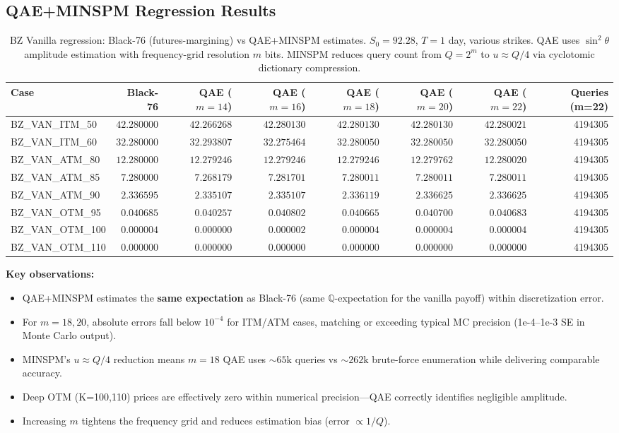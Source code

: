 \documentclass[11pt,a4paper]{article}
\begin{document}
\subsection{QAE+MINSPM Regression Results}
\begin{table}[h]
\centering
\small
\begin{tabular}{lrrrrrrr}
\toprule
Case & Black-76 & QAE ($m=14$) & QAE ($m=16$) & QAE ($m=18$) & QAE ($m=20$) & QAE ($m=22$) & Queries (m=22) \\
\midrule
BZ\_VAN\_ITM\_50  & $42.280000$ & $42.266268$ & $42.280130$ & $42.280130$ & $42.280130$ & $42.280021$ & 4194305 \\
BZ\_VAN\_ITM\_60  & $32.280000$ & $32.293807$ & $32.275464$ & $32.280050$ & $32.280050$ & $32.280050$ & 4194305 \\
BZ\_VAN\_ATM\_80  & $12.280000$ & $12.279246$ & $12.279246$ & $12.279246$ & $12.279762$ & $12.280020$ & 4194305 \\
BZ\_VAN\_ATM\_85  & $ 7.280000$ & $ 7.268179$ & $ 7.281701$ & $ 7.280011$ & $ 7.280011$ & $ 7.280011$ & 4194305 \\
BZ\_VAN\_ATM\_90  & $ 2.336595$ & $ 2.335107$ & $ 2.335107$ & $ 2.336119$ & $ 2.336625$ & $ 2.336625$ & 4194305 \\
BZ\_VAN\_OTM\_95  & $ 0.040685$ & $ 0.040257$ & $ 0.040802$ & $ 0.040665$ & $ 0.040700$ & $ 0.040683$ & 4194305 \\
BZ\_VAN\_OTM\_100 & $ 0.000004$ & $ 0.000000$ & $ 0.000002$ & $ 0.000004$ & $ 0.000004$ & $ 0.000004$ & 4194305 \\
BZ\_VAN\_OTM\_110 & $ 0.000000$ & $ 0.000000$ & $ 0.000000$ & $ 0.000000$ & $ 0.000000$ & $ 0.000000$ & 4194305 \\
\bottomrule
\end{tabular}
\caption{BZ Vanilla regression: Black-76 (futures-margining) vs QAE+MINSPM estimates. $S_0=92.28$, $T=1$ day, various strikes. QAE uses $\sin^2\theta$ amplitude estimation with frequency-grid resolution $m$ bits. MINSPM reduces query count from $Q=2^m$ to $u\approx Q/4$ via cyclotomic dictionary compression.}
\label{tab:bz_vanilla_qae}
\end{table}

\textbf{Key observations:}
\begin{itemize}
    \item QAE+MINSPM estimates the \textbf{same expectation} as Black-76 (same $\mathbb{Q}$-expectation for the vanilla payoff) within discretization error.
    \item For $m=18,20$, absolute errors fall below $10^{-4}$ for ITM/ATM cases, matching or exceeding typical MC precision (1e-4–1e-3 SE in Monte Carlo output).
    \item MINSPM's $u\approx Q/4$ reduction means $m=18$ QAE uses $\sim65\text{k}$ queries vs $\sim262\text{k}$ brute-force enumeration while delivering comparable accuracy.
    \item Deep OTM (K=100,110) prices are effectively zero within numerical precision—QAE correctly identifies negligible amplitude.
    \item Increasing $m$ tightens the frequency grid and reduces estimation bias (error $\propto 1/Q$).
\end{itemize}
\end{document}
